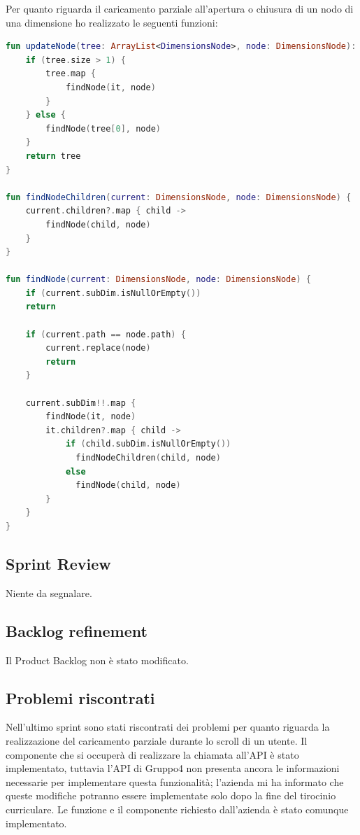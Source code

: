 Per quanto riguarda il caricamento parziale all'apertura o chiusura di un nodo di una dimensione ho realizzato le seguenti funzioni:
\begin{lstlisting}[caption={Funzione parseJSON()}, label={lst:bodycells}, language=Kotlin]
fun updateNode(tree: ArrayList<DimensionsNode>, node: DimensionsNode): ArrayList<DimensionsNode> {
	if (tree.size > 1) {
		tree.map {
			findNode(it, node)
		}
	} else {
		findNode(tree[0], node)
	}
	return tree
}

fun findNodeChildren(current: DimensionsNode, node: DimensionsNode) {
	current.children?.map { child ->
		findNode(child, node)
	}
}

fun findNode(current: DimensionsNode, node: DimensionsNode) {
	if (current.subDim.isNullOrEmpty())
	return
	
	if (current.path == node.path) {
		current.replace(node)
		return
	}
	
	current.subDim!!.map {
		findNode(it, node)
		it.children?.map { child ->
			if (child.subDim.isNullOrEmpty())
			  findNodeChildren(child, node)
			else
			  findNode(child, node)
		}
	}
}
\end{lstlisting}
\subsection{Sprint Review}
Niente da segnalare.

\subsection{Backlog refinement}
Il Product Backlog non è stato modificato.

\subsection{Problemi riscontrati}
Nell'ultimo sprint sono stati riscontrati dei problemi per quanto riguarda la realizzazione del caricamento parziale durante lo scroll di un utente. Il componente che si occuperà di realizzare la chiamata all'API è stato implementato, tuttavia l'API di Gruppo4 non presenta ancora le informazioni necessarie per implementare questa funzionalità; l'azienda mi ha informato che queste modifiche potranno essere implementate solo dopo la fine del tirocinio curriculare. Le funzione e il componente richiesto dall'azienda è stato comunque implementato.
